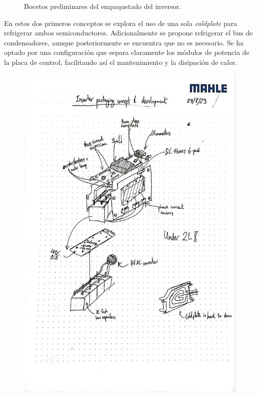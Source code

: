 \begin{figure}[H]
\begin{minipage}{0.45\textwidth}
	\end{minipage}
	\caption{Bocetos preliminares del empaquetado del inversor.}
\end{figure}

En estos dos primeros conceptos se explora el uso de una sola \textit{coldplate} para refrigerar ambos semiconductores. Adicionalmente se propone refrigerar el bus de condensadores, aunque posteriormente se encuentra que no es necesario. Se ha optado por una configuración que separa claramente los módulos de potencia de la placa de control, facilitando así el mantenimiento y la disipación de calor.

\begin{figure}[H]
	\centering
	\begin{minipage}{0.45\textwidth}
		\centering
		\includegraphics[width=\textwidth]{fig/boceto3}

\end{minipage}
\end{figure}
